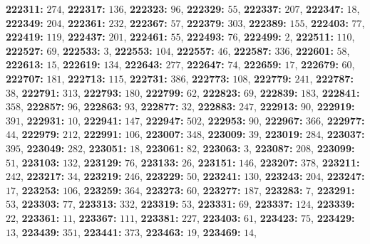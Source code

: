 \textsf{\bfseries 222311:} $274$, \textsf{\bfseries 222317:} $136$, \textsf{\bfseries 222323:} $96$, \textsf{\bfseries 222329:} $55$, \textsf{\bfseries 222337:} $207$, \textsf{\bfseries 222347:} $18$, \textsf{\bfseries 222349:} $204$, \textsf{\bfseries 222361:} $232$, \textsf{\bfseries 222367:} $57$, \textsf{\bfseries 222379:} $303$, \textsf{\bfseries 222389:} $155$, \textsf{\bfseries 222403:} $77$, \textsf{\bfseries 222419:} $119$, \textsf{\bfseries 222437:} $201$, \textsf{\bfseries 222461:} $55$, \textsf{\bfseries 222493:} $76$, \textsf{\bfseries 222499:} $2$, \textsf{\bfseries 222511:} $110$, \textsf{\bfseries 222527:} $69$, \textsf{\bfseries 222533:} $3$, \textsf{\bfseries 222553:} $104$, \textsf{\bfseries 222557:} $46$, \textsf{\bfseries 222587:} $336$, \textsf{\bfseries 222601:} $58$, \textsf{\bfseries 222613:} $15$, \textsf{\bfseries 222619:} $134$, \textsf{\bfseries 222643:} $277$, \textsf{\bfseries 222647:} $74$, \textsf{\bfseries 222659:} $17$, \textsf{\bfseries 222679:} $60$, \textsf{\bfseries 222707:} $181$, \textsf{\bfseries 222713:} $115$, \textsf{\bfseries 222731:} $386$, \textsf{\bfseries 222773:} $108$, \textsf{\bfseries 222779:} $241$, \textsf{\bfseries 222787:} $38$, \textsf{\bfseries 222791:} $313$, \textsf{\bfseries 222793:} $180$, \textsf{\bfseries 222799:} $62$, \textsf{\bfseries 222823:} $69$, \textsf{\bfseries 222839:} $183$, \textsf{\bfseries 222841:} $358$, \textsf{\bfseries 222857:} $96$, \textsf{\bfseries 222863:} $93$, \textsf{\bfseries 222877:} $32$, \textsf{\bfseries 222883:} $247$, \textsf{\bfseries 222913:} $90$, \textsf{\bfseries 222919:} $391$, \textsf{\bfseries 222931:} $10$, \textsf{\bfseries 222941:} $147$, \textsf{\bfseries 222947:} $502$, \textsf{\bfseries 222953:} $90$, \textsf{\bfseries 222967:} $366$, \textsf{\bfseries 222977:} $44$, \textsf{\bfseries 222979:} $212$, \textsf{\bfseries 222991:} $106$, \textsf{\bfseries 223007:} $348$, \textsf{\bfseries 223009:} $39$, \textsf{\bfseries 223019:} $284$, \textsf{\bfseries 223037:} $395$, \textsf{\bfseries 223049:} $282$, \textsf{\bfseries 223051:} $18$, \textsf{\bfseries 223061:} $82$, \textsf{\bfseries 223063:} $3$, \textsf{\bfseries 223087:} $208$, \textsf{\bfseries 223099:} $51$, \textsf{\bfseries 223103:} $132$, \textsf{\bfseries 223129:} $76$, \textsf{\bfseries 223133:} $26$, \textsf{\bfseries 223151:} $146$, \textsf{\bfseries 223207:} $378$, \textsf{\bfseries 223211:} $242$, \textsf{\bfseries 223217:} $34$, \textsf{\bfseries 223219:} $246$, \textsf{\bfseries 223229:} $50$, \textsf{\bfseries 223241:} $130$, \textsf{\bfseries 223243:} $204$, \textsf{\bfseries 223247:} $17$, \textsf{\bfseries 223253:} $106$, \textsf{\bfseries 223259:} $364$, \textsf{\bfseries 223273:} $60$, \textsf{\bfseries 223277:} $187$, \textsf{\bfseries 223283:} $7$, \textsf{\bfseries 223291:} $53$, \textsf{\bfseries 223303:} $77$, \textsf{\bfseries 223313:} $332$, \textsf{\bfseries 223319:} $53$, \textsf{\bfseries 223331:} $69$, \textsf{\bfseries 223337:} $124$, \textsf{\bfseries 223339:} $22$, \textsf{\bfseries 223361:} $11$, \textsf{\bfseries 223367:} $111$, \textsf{\bfseries 223381:} $227$, \textsf{\bfseries 223403:} $61$, \textsf{\bfseries 223423:} $75$, \textsf{\bfseries 223429:} $13$, \textsf{\bfseries 223439:} $351$, \textsf{\bfseries 223441:} $373$, \textsf{\bfseries 223463:} $19$, \textsf{\bfseries 223469:} $14$, 
